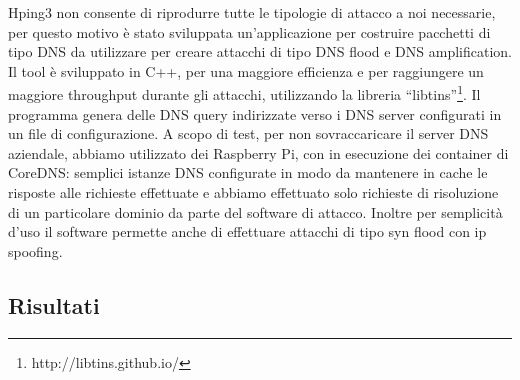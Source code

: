 Hping3 non consente di riprodurre tutte le tipologie di attacco a noi necessarie, per questo motivo è stato sviluppata un'applicazione per costruire pacchetti di tipo DNS da utilizzare per creare attacchi di tipo DNS flood e DNS amplification.
Il tool è sviluppato in C++, per una maggiore efficienza e per raggiungere un maggiore throughput durante gli attacchi, utilizzando la libreria ``libtins''\footnote{ http://libtins.github.io/}.
Il programma genera delle DNS query indirizzate verso i DNS server configurati in un file di configurazione. A scopo di test, per non sovraccaricare il server DNS aziendale, abbiamo utilizzato dei Raspberry Pi, con in esecuzione dei container di CoreDNS: semplici istanze DNS configurate in modo da mantenere in cache le risposte alle richieste effettuate e abbiamo effettuato solo richieste di risoluzione di un particolare dominio da parte del software di attacco.
Inoltre per semplicità d'uso il software permette anche di effettuare attacchi di tipo syn flood con ip spoofing.


\subsection{Risultati}



